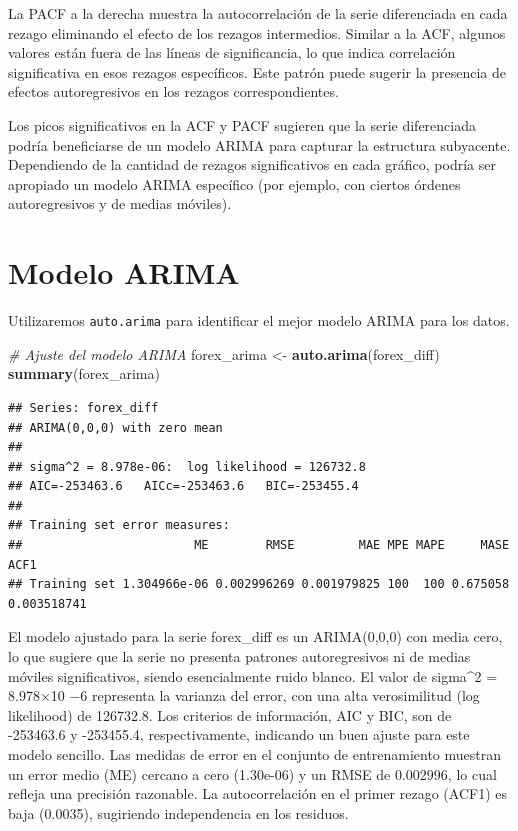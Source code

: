 \documentclass[
]{book}
\newenvironment{Shaded}{\begin{snugshade}}{\end{snugshade}}
\newcommand{\CommentTok}[1]{\textcolor[rgb]{0.56,0.35,0.01}{\textit{#1}}}
\newcommand{\FunctionTok}[1]{\textcolor[rgb]{0.13,0.29,0.53}{\textbf{#1}}}
\newcommand{\NormalTok}[1]{#1}
\newcommand{\OtherTok}[1]{\textcolor[rgb]{0.56,0.35,0.01}{#1}}
\begin{document}
La PACF a la derecha muestra la autocorrelación de la serie diferenciada en cada rezago eliminando el efecto de los rezagos intermedios. Similar a la ACF, algunos valores están fuera de las líneas de significancia, lo que indica correlación significativa en esos rezagos específicos. Este patrón puede sugerir la presencia de efectos autoregresivos en los rezagos correspondientes.

Los picos significativos en la ACF y PACF sugieren que la serie diferenciada podría beneficiarse de un modelo ARIMA para capturar la estructura subyacente. Dependiendo de la cantidad de rezagos significativos en cada gráfico, podría ser apropiado un modelo ARIMA específico (por ejemplo, con ciertos órdenes autoregresivos y de medias móviles).

\section{Modelo ARIMA}\label{modelo-arima}

Utilizaremos \texttt{auto.arima} para identificar el mejor modelo ARIMA para los datos.

\begin{Shaded}
\begin{Highlighting}[]
\CommentTok{\# Ajuste del modelo ARIMA}
\NormalTok{forex\_arima }\OtherTok{\textless{}{-}} \FunctionTok{auto.arima}\NormalTok{(forex\_diff)}
\FunctionTok{summary}\NormalTok{(forex\_arima)}
\end{Highlighting}
\end{Shaded}

\begin{verbatim}
## Series: forex_diff 
## ARIMA(0,0,0) with zero mean 
## 
## sigma^2 = 8.978e-06:  log likelihood = 126732.8
## AIC=-253463.6   AICc=-253463.6   BIC=-253455.4
## 
## Training set error measures:
##                        ME        RMSE         MAE MPE MAPE     MASE        ACF1
## Training set 1.304966e-06 0.002996269 0.001979825 100  100 0.675058 0.003518741
\end{verbatim}

El modelo ajustado para la serie forex\_diff es un ARIMA(0,0,0) con media cero, lo que sugiere que la serie no presenta patrones autoregresivos ni de medias móviles significativos, siendo esencialmente ruido blanco. El valor de sigma\^{}2 = 8.978×10 −6 representa la varianza del error, con una alta verosimilitud (log likelihood) de 126732.8. Los criterios de información, AIC y BIC, son de -253463.6 y -253455.4, respectivamente, indicando un buen ajuste para este modelo sencillo. Las medidas de error en el conjunto de entrenamiento muestran un error medio (ME) cercano a cero (1.30e-06) y un RMSE de 0.002996, lo cual refleja una precisión razonable. La autocorrelación en el primer rezago (ACF1) es baja (0.0035), sugiriendo independencia en los residuos.
\end{document}
